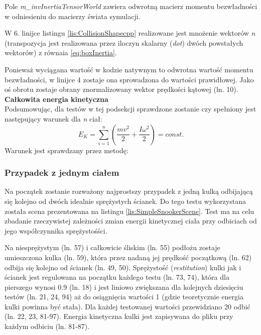 

Pole \emph{m\_invInertiaTensorWorld} zawiera odwrotną macierz momentu
bezwładności w odniesieniu do macierzy świata symulacji.



W 6. linijce listingu \ref{lis:CollisionShapecpp} realizowane jest mnożenie wektorów
\emph{n} (transpozycja jest realizowana przez iloczyn skalarny (\emph{dot})
dwóch powstałych wektorów) z równaia \ref{eq:boxInertia}.



Ponieważ wyciągana wartość w kodzie natywnym to odwrotna wartość momentu
bezwładności, w linijce 4 zostaje ona sprowadzona do wartości prawidłowej. Jako
oś obrotu zostaje obrany znormalizowany wektor prędkości kątowej (ln. 10).\\
\textbf{Całkowita energia kinetyczna}\\
Podsumowując, dla testów w tej podsekcji sprawdzone zostanie czy spełniony
jest następujący warunek dla \emph{n} ciał:
\begin{equation}
E_{K} = \sum_{i=1}^{n}\left(\frac{mv^{2}}{2} + \frac{I\omega^{2}}{2}\right) =
const.
\end{equation}
Warunek jest sprawdzany przez metodę:


\subsubsection{Przypadek z jednym ciałem}
Na początek zostanie rozważony najprostszy przypadek z jedną kulką odbijającą
się kolejno od dwóch idealnie sprężystych ścianek. Do tego testu wykorzystana
została scena prezentowana na listingu \ref{lis:SimpleSnookerScene}. Test ma na
celu zbadanie rzeczywistej zależności zmian energii kinetycznej ciała przy
odbiciach od jego współczynnika sprężystośści.


Na niesprężystym (ln. 57) i całkowicie śliskim (ln. 55) podłożu zostaje
umieszczona kulka (ln. 59), która przez nadaną jej prędkość początkową (ln. 62)
odbija się kolejno od ścianek (ln. 49, 50). Sprężystość (\emph{restitution})
kulki jak i ścianek jest regulowana na początku każdego testu (ln. 73, 74),
która dla pierszego wynosi 0.9 (ln. 18) i jest liniowo zwiększana dla kolejnych
dziesięciu testów (ln. 21, 24, 94) aż do osiągnięcia wartości 1 (gdzie
teoretycznie energia kulki powinna być stała).
Dla każdej testowanej wartości przewidziano 20 odbić (ln. 22, 23, 81-97).
Energia kinetyczna kulki jest zapisywana do pliku przy każdym odbiciu (ln.
81-87).


